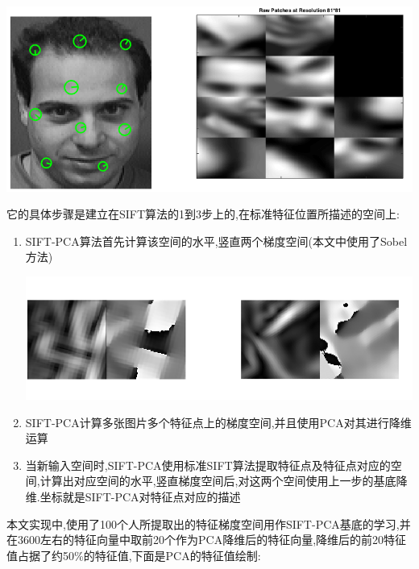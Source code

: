 	 	\begin{center}
		\begin{minipage}[t]{\linewidth}
		\center
		{
		\includegraphics[width=\textwidth]{Img/c3/sift_raw_patch2} 
		\captionsetup{justification=centering}
		}
		\end{minipage}
		\medskip
		\end{center}
	
	它的具体步骤是建立在SIFT算法的1到3步上的,在标准特征位置所描述的空间上:
	\begin{enumerate}
		\item SIFT-PCA算法首先计算该空间的水平,竖直两个梯度空间(本文中使用了Sobel方法)
			
		\begin{center}
		\begin{minipage}[t]{\linewidth}
		\center
		{
		\includegraphics[width=\textwidth]{Img/c3/gradient.png} 
		\captionsetup{justification=centering}
		}
		\end{minipage}
		\medskip
		\end{center}
		
		\item SIFT-PCA计算多张图片多个特征点上的梯度空间,并且使用PCA对其进行降维运算
		\item 当新输入空间时,SIFT-PCA使用标准SIFT算法提取特征点及特征点对应的空间,计算出对应空间的水平,竖直梯度空间后,对这两个空间使用上一步的基底降维.坐标就是SIFT-PCA对特征点对应的描述
	\end{enumerate}
	本文实现中,使用了100个人所提取出的特征梯度空间用作SIFT-PCA基底的学习,并在3600左右的特征向量中取前20个作为PCA降维后的特征向量,降维后的前20特征值占据了约50\%的特征值,下面是PCA的特征值绘制:
	
